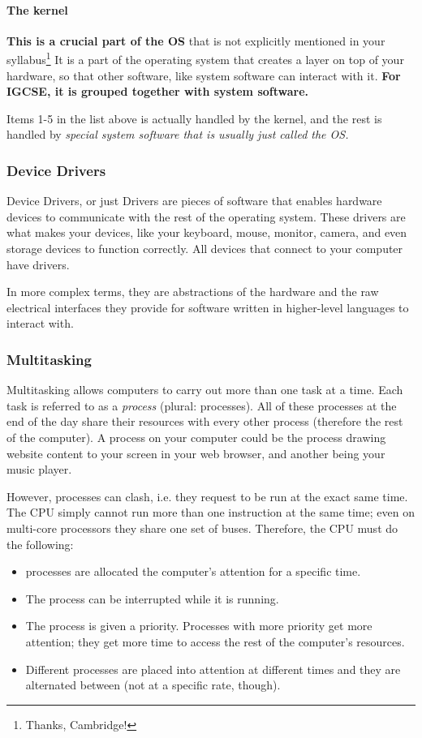 \documentclass[../main.tex]{subfiles}
\begin{document}
\paragraph{The kernel}

\textbf{This is a crucial part of the OS} that is not explicitly mentioned in your syllabus\footnote{Thanks, Cambridge!} It is a part of the operating system that creates a layer on top of your hardware, so that other software, like system software can interact with it. \textbf{For IGCSE, it is grouped together with system software.}

Items 1-5 in the list above is actually handled by the kernel, and the rest is handled by \emph{special system software that is usually just called the OS.}

\subsubsection{Device Drivers}

Device Drivers, or just Drivers are pieces of software that enables hardware devices to communicate with the rest of the operating system. These drivers are what makes your devices, like your keyboard, mouse, monitor, camera, and even storage devices to function correctly. All devices that connect to your computer have drivers. 

In more complex terms, they are abstractions of the hardware and the raw electrical interfaces they provide for software written in higher-level languages to interact with.

\subsubsection{Multitasking}

Multitasking allows computers to carry out more than one task at a time. Each task is referred to as a \emph{process} (plural: processes). All of these processes at the end of the day share their resources with every other process (therefore the rest of the computer). A process on your computer could be the process drawing website content to your screen in your web browser, and another being your music player.

However, processes can clash, i.e. they request to be run at the exact same time. The CPU simply cannot run more than one instruction at the same time; even on multi-core processors they share one set of buses. Therefore, the CPU must do the following:

\begin{itemize}
    \item processes are allocated the computer's attention for a specific time.
    \item The process can be interrupted while it is running.
    \item The process is given a priority. Processes with more priority get more attention; they get more time to access the rest of the computer's resources. 
    \item Different processes are placed into attention at different times and they are alternated between (not at a specific rate, though).
\end{itemize}
\end{document}
